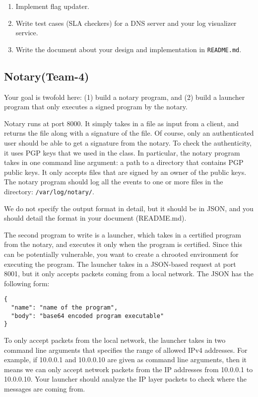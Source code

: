 \documentclass[a4paper, 11pt]{article}
\newcommand*{\Modfour}{Notary\xspace}%
\theoremstyle{definition}
\begin{document}
{\begin{enumerate}
  \item Implement flag updater.

  \item Write test cases (SLA checkers) for a DNS server and your log
    visualizer service.

  \item Write the document about your design and implementation in
    \texttt{README.md}.

\end{enumerate}

\subsection{\Modfour (Team-4)} \label{ss:notary}

Your goal is twofold here: (1) build a notary program, and (2) build a
launcher program that only executes a signed program by the notary.

Notary runs at port 8000. It simply takes in a file as input from a
client, and returns the file along with a signature of the file. Of
course, only an authenticated user should be able to get a signature
from the notary. To check the authenticity, it uses PGP keys that we
used in the class. In particular, the notary program takes in one
command line argument: a path to a directory that contains PGP public
keys. It only accepts files that are signed by an owner of the public
keys.
%
The notary program should log all the events to one or more files in
the directory: \texttt{/var/log/notary/}.

We do not specify the output format in detail, but it should be in
JSON, and you should detail the format in your document (README.md).

The second program to write is a launcher, which takes in a certified
program from the notary, and executes it only when the program is
certified. Since this can be potentially vulnerable, you want to
create a chrooted environment for executing the program. The launcher
takes in a JSON-based request at port 8001, but it only accepts
packets coming from a local network. The JSON has the following form:

\begin{lstlisting}
{
  "name": "name of the program",
  "body": "base64 encoded program executable"
}
\end{lstlisting}

To only accept packets from the local network, the launcher takes in
two command line arguments that specifies the range of allowed IPv4
addresses. For example, if 10.0.0.1 and 10.0.0.10 are given as command
line arguments, then it means we can only accept network packets from
the IP addresses from 10.0.0.1 to 10.0.0.10. Your launcher should
analyze the IP layer packets to check where the messages are coming
from.

}
\end{document}

